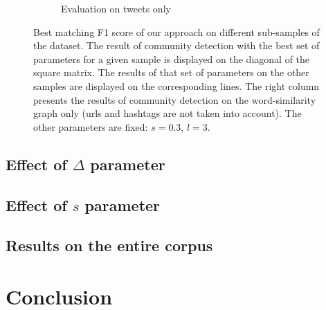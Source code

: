 \begin{figure}
\begin{subfigure}[b]{1\textwidth}
\begin{center}
       \caption{Evaluation on tweets only}
    \label{fig:louvain_macro_tweets}
     \end{center}
\end{subfigure}
\caption[Best matching F1 score of our approach on different sub-samples of the dataset]{Best matching F1 score of our approach on different sub-samples of the dataset. The result of community detection with the best set of parameters for a given sample is displayed on the diagonal of the square matrix. The results of that set of parameters on the other samples are displayed on the corresponding lines. The right column presents the results of community detection on the word-similarity graph only (urls and hashtags are not taken into account). The other parameters are fixed: $s=0.3$, $l=3$.}
\label{fig:louvain_macro}
\end{figure}

\subsection{Effect of $\Delta$ parameter}
\subsection{Effect of $s$ parameter}
\subsection{Results on the entire corpus}
\label{Joint_results}

\section{Conclusion}
